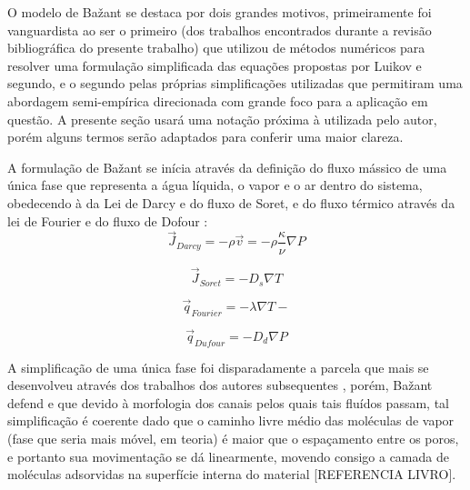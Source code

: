     O modelo de Ba\v{z}ant se destaca por dois grandes motivos, primeiramente foi
    vanguardista ao ser o primeiro (dos trabalhos encontrados durante a revisão
    bibliográfica do presente trabalho) que utilizou de métodos numéricos para
    resolver uma formulação simplificada das equações propostas por Luikov e
    segundo, e o segundo pelas próprias simplificações utilizadas que permitiram
    uma abordagem semi-empírica direcionada com grande foco para a aplicação em
    questão. A presente seção usará uma notação próxima à utilizada pelo autor,
    porém alguns termos serão adaptados para conferir uma maior clareza.

    A formulação de Ba\v{z}ant se inícia através da definição do fluxo mássico
    de uma única fase que representa a água líquida, o vapor e o ar dentro do
    sistema, obedecendo à da Lei de Darcy e do fluxo de Soret, e do fluxo térmico através da
    lei de Fourier e do fluxo de Dofour \cite{bazant1978thermal, bazant1978, bavzant1982, bazant1979}:
    \begin{equation}
      \label{eq:Darcy}
      \vec{J}_{Darcy} = - \rho \vec{v} = - \rho \frac{\kappa }{\nu} \nabla P 
    \end{equation}

    \begin{equation}
      \label{eq:Soret}
      \vec{J}_{Soret} = - D_s \nabla T
    \end{equation}

    \begin{equation}
      \label{eq:Fourier}
     \vec{q}_{Fourier} = - \lambda \nabla T - 
    \end{equation}

    \begin{equation}
      \label{eq:Dufour}
      \vec{q}_{Dufour} = - D_d \nabla P
    \end{equation}

    A simplificação de uma única fase foi disparadamente a parcela que mais se
    desenvolveu através dos trabalhos dos autores
    subsequentes \cite{Pesavento2013, Gong1995a, Gong1991, Gawin2003, Gawin2004,
      Gawin1999, Fey2016b, Davie2006a, Davie2012a, Abdel-Rahman1996}, porém,
    Ba\v{z}ant defend e que devido à morfologia dos canais pelos quais tais fluídos passam, tal simplificação é coerente dado que o caminho livre médio das moléculas de vapor (fase que seria mais móvel, em teoria) é maior que o espaçamento entre os poros, e portanto sua
    movimentação se dá linearmente, movendo consigo a camada de moléculas
    adsorvidas na superfície interna do material [REFERENCIA LIVRO].
    
